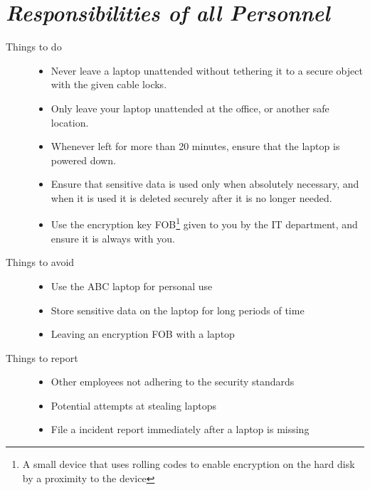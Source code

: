 \documentclass[10pt, twocolumn]{article}
\numberwithin{equation}{section} %
\numberwithin{figure}{section} %
\numberwithin{table}{section} %
\begin{document}
\section{\textit{Responsibilities of all Personnel}}
\begin{description}
	\item[Things to do] \hfill
		\begin{itemize}
			\item Never leave a laptop unattended without tethering it to a secure object with the given cable locks.  
			\item Only leave your laptop unattended at the office, or another safe location.
			\item Whenever left for more than 20 minutes, ensure that the laptop is powered down.
			\item Ensure that sensitive data is used only when absolutely necessary, and when it is used it is deleted securely after it is no longer needed. 
			\item Use the encryption key FOB\footnote{A small device that uses rolling codes to enable encryption on the hard disk by a proximity to the device} given to you by the IT department, and ensure it is always with you.  
		\end{itemize}
	\item[Things to avoid] \hfill
		\begin{itemize}
			\item Use the ABC laptop for personal use
			\item Store sensitive data on the laptop for long periods of time
			\item Leaving an encryption FOB with a laptop
		\end{itemize}
	\item[Things to report] \hfill
		\begin{itemize}
			\item Other employees not adhering to the security standards
			\item Potential attempts at stealing laptops
			\item File a incident report immediately after a laptop is missing
		\end{itemize}
\end{description}
\end{document}
